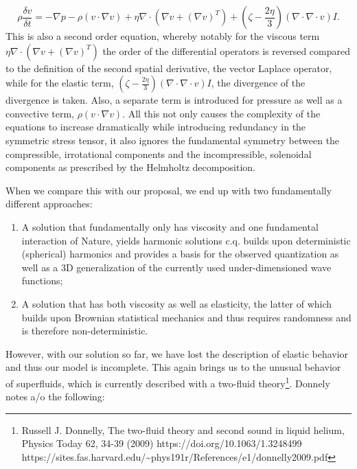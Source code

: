 \documentclass{article}
\begin{document}
\begin{equation}
\rho \frac{\mathit{\delta v}}{\mathit{\delta t}}=-{\nabla}p-\rho \left(v\cdot {\nabla}v\right)+\eta {\nabla}\cdot
\left({\nabla}v+\left({\nabla}v\right)^T\right)+\left(\zeta -\frac{2\eta } 3\right)\left({\nabla}\cdot {\nabla}\cdot
v\right)\mathit{I.}
\end{equation}
This is also a second order equation, whereby notably for the viscous term  $\eta
{\nabla}{\cdot}\left({\nabla}v+\left({\nabla}v\right)^T\right)$  the order of the differential operators is reversed
compared to the definition of the second spatial derivative, the vector Laplace operator, while for the elastic term, 
$\left(\zeta -\frac{2\eta } 3\right)\left({\nabla}{\cdot}{\nabla}{\cdot}v\right)I$, the divergence of the divergence is
taken. Also, a separate term is introduced for pressure as well as a convective term,  $\rho
\left(v{\cdot}{\nabla}v\right)$. All this not only causes the complexity of the equations to increase dramatically
while introducing redundancy in the symmetric stress tensor, it also ignores the fundamental symmetry between the
compressible, irrotational components and the incompressible, solenoidal components as prescribed by the Helmholtz
decomposition.

When we compare this with our proposal, we end up with two fundamentally different approaches:

\begin{enumerate}
\item A solution that fundamentally only has viscosity and one fundamental interaction of Nature, yields harmonic
solutions c.q. builds upon deterministic (spherical) harmonics and provides a basis for the observed quantization as
well as a 3D generalization of the currently used under-dimensioned wave functions;
\item A solution that has both viscosity as well as elasticity, the latter of which builds upon Brownian statistical
mechanics and thus requires randomness and is therefore non-deterministic.  
\end{enumerate}
However, with our solution so far, we have lost the description of elastic behavior and thus our model is incomplete.
This again brings us to the unusual behavior of superfluids, which is currently described with a two-fluid
theory\footnote{ Russell J. Donnelly, {\textquotedbl}The two-fluid theory and second sound in liquid
helium{\textquotedbl}, Physics Today 62, 34-39 (2009) https://doi.org/10.1063/1.3248499
https://sites.fas.harvard.edu/\~{}phys191r/References/e1/donnelly2009.pdf \par }. Donnely notes a/o the following: 
\end{document}
